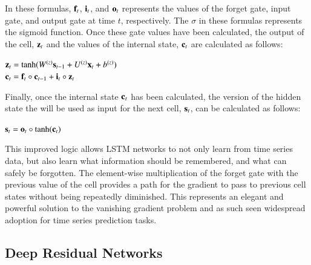 In these formulas, $\text{{\bf f}}_t$, $\text{{\bf i}}_t$, and $\text{{\bf o}}_t$ represents the values of the forget gate, input gate, and output gate at time $t$, respectively. The $\sigma$ in these formulas represents the sigmoid function. Once these gate values have been calculated, the output of the cell, $\text{{\bf z}}_t$ and the values of the internal state, $\text{{\bf c}}_t$ are calculated as follows:

\begin{center}
    $\text{{\bf z}}_t = \text{tanh}(W^{(z)}\text{{\bf s}}_{t-1} + U^{(z)}\text{{\bf x}}_{t} + b^{(z)})$\\
    $\text{{\bf c}}_t = \text{{\bf f}}_{t}\circ\text{{\bf c}}_{t-1} + \text{{\bf i}}_{t}\circ\text{{\bf z}}_t$
\end{center}

Finally, once the internal state $\text{{\bf c}}_t$ has been calculated, the version of the hidden state the will be used as input for the next cell, $\text{{\bf s}}_t$, can be calculated as follows:

\begin{center}
    $\text{{\bf s}}_t = \text{{\bf o}}_{t}\circ\text{tanh}(\text{{\bf c}}_t)$
\end{center}

This improved logic allows \ac{LSTM} networks to not only learn from time series data, but also learn what information should be remembered, and what can safely be forgotten. The element-wise multiplication of the forget gate with the previous value of the cell provides a path for the gradient to pass to previous cell states without being repeatedly diminished. This represents an elegant and powerful solution to the vanishing gradient problem and as such seen widespread adoption for time series prediction tasks.

\subsection{Deep Residual Networks}

